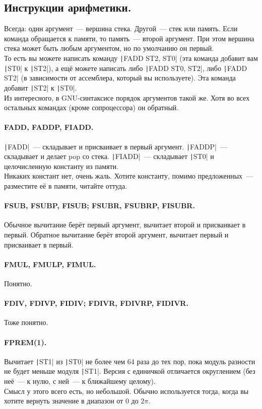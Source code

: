 \documentclass{article}
\begin{document}
    \subsection{Инструкции арифметики.}
    Всегда: один аргумент~--- вершина стека. Другой~--- стек или память. Если команда обращается к памяти, то память~--- второй аргумент. При этом вершина стека может быть любым аргументом, но по умолчанию он первый.\\
    То есть вы можете написать команду \texttt|FADD ST2, ST0| (эта команда добавит вам \texttt|ST0| к \texttt|ST2|), а ещё можете написать либо \texttt|FADD ST0, ST2|, либо \texttt|FADD ST2| (в зависимости от ассемблера, который вы используете). Эта команда добавит \texttt|ST2| к \texttt|ST0|.\\
    Из интересного, в GNU-синтаксисе порядок аргументов такой же. Хотя во всех остальных командах (кроме сопроцессора) он обратный.
    \paragraph{FADD, FADDP, FIADD.}
    \texttt|FADD|~--- складывает и присваивает в первый аргумент. \texttt|FADDP|~--- складывает и делает pop со стека. \texttt|FIADD|~--- складывает \texttt|ST0| и целочисленную константу из памяти.\\
    Никаких констант нет, очень жаль. Хотите константу, помимо предложенных~--- разместите её в памяти, читайте оттуда.
    \paragraph{FSUB, FSUBP, FISUB; FSUBR, FSUBRP, FISUBR.}
    Обычное вычитание берёт первый аргумент, вычитает второй и присваивает в первый. Обратное вычитание берёт второй аргумент, вычитает первый и присваивает в первый.
    \paragraph{FMUL, FMULP, FIMUL.}
    Понятно.
    \paragraph{FDIV, FDIVP, FIDIV; FDIVR, FDIVRP, FIDIVR.}
    Тоже понятно.
    \paragraph{FPREM(1).}
    Вычитает \texttt|ST1| из \texttt|ST0| не более чем 64 раза до тех пор, пока модуль разности не будет меньше модуля \texttt|ST1|. Версия с единичкой отличается округлением (без неё~--- к нулю, с ней~--- к ближайшему целому).\\
    Смысл у этого всего есть, но небольшой. Обычно используется тогда, когда вы хотите вернуть значение в диапазон от 0 до $2\pi$.
\end{document}
